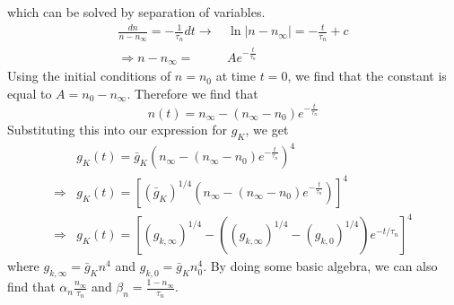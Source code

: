 \documentclass{article}
\numberwithin{equation}{section}
\begin{document}
which can be solved by separation of variables.
\begin{equation}
\begin{split}
    \frac{dn}{n-n_\infty} = -\frac{1}{\tau_n}dt \rightarrow & \, \ln|n-n_\infty| = -\frac{t}{\tau_n}+c
    \\ \Rightarrow n-n_\infty =& \, Ae^{-\frac{t}{\tau_n}}
\end{split}
\end{equation}
Using the initial conditions of $n=n_0$ at time $t=0$, we find that the constant is equal to $A=n_0 -n_\infty$. Therefore we find that 
\begin{equation}
    n(t)=n_\infty - (n_\infty - n_0)e^{-\frac{t}{\tau_n}}
\end{equation}
Substituting this into our expression for $g_K$, we get 
\begin{equation*}
\begin{split}
    &g_K(t)=\bar{g}_K(n_\infty-(n_\infty-n_0)e^{-\frac{t}{\tau_n}})^4 \\
    \Rightarrow &g_K(t) = \left[(\bar{g}_K )^{1/4} (n_\infty-(n_\infty-n_0)e^{-\frac{t}{\tau_n}})\right]^{4} \\
    \Rightarrow &g_K(t)=\left[ (g_{k,\infty})^{1/4}-( (g_{k,\infty})^{1/4}-(g_{k,0})^{1/4})e^{-t/\tau_n}      \right]^4
\end{split}
\end{equation*}
where $g_{k,\infty} = \bar{g}_Kn^4$ and $g_{k,0} = \bar{g}_Kn_0^4$. By doing some basic algebra, we can also find that $\alpha_n \frac{n_\infty}{\tau_n}$ and $\beta_n=\frac{1-n_\infty}{\tau_n}$.
\end{document}
